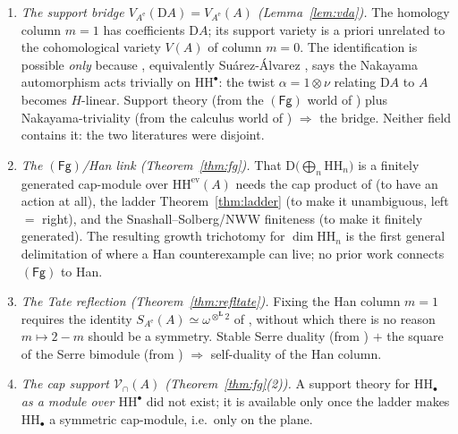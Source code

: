 \documentclass[11pt]{amsart}
\theoremstyle{definition}
\newcommand{\HH}{\mathrm{HH}}
\newcommand{\D}{\mathrm{D}}
\newcommand{\Ae}{A^{\mathrm{e}}}
\newcommand{\Lotimes}{\otimes^{\mathbf{L}}}
\newcommand{\Vcap}{\mathcal{V}_{\cap}}
\newcommand{\Fg}{\mathsf{(Fg)}}
\newcommand{\ev}{\mathrm{ev}}
\begin{document}
\begin{enumerate}[label=\textup{(\alph*)},leftmargin=2.2em]
\item \emph{The support bridge $V_{\Ae}(\D A)=V_{\Ae}(A)$
(Lemma~\ref{lem:vda}).} The homology column $m=1$ has coefficients $\D A$; its
support variety is a priori unrelated to the cohomological variety $V(A)$ of
column $m=0$. The identification is possible \emph{only} because \cite[Cor.~6.3]{ArmCox}, equivalently Su\'arez-\'Alvarez
\cite{SuarezAlvarez}, says the Nakayama automorphism acts trivially on
$\HH^\bullet$: the twist $\alpha=1\otimes\nu$ relating $\D A$ to $A$ becomes
$H$-linear. Support theory (from the $\Fg$ world of \cite{EHSST}) plus
Nakayama-triviality (from the calculus world of \cite{ArmCox}) $\Rightarrow$ the
bridge. Neither field contains it: the two literatures were disjoint.
\item \emph{The $\Fg$/Han link (Theorem~\ref{thm:fg}).} That
$\D\bigl(\bigoplus_n\HH_n\bigr)$ is a finitely generated cap-module over
$\HH^{\ev}(A)$ needs the cap product of \cite{ArmCap} (to have an action at
all), the ladder Theorem~\ref{thm:ladder} (to make it unambiguous, left $=$
right), and the Snashall--Solberg/NWW finiteness \cite{NWW} (to make it
finitely generated). The resulting growth trichotomy for $\dim\HH_n$ is the
first general delimitation of where a Han counterexample can live; no prior
work connects $\Fg$ to Han.
\item \emph{The Tate reflection (Theorem~\ref{thm:refltate}).} Fixing the Han
column $m=1$ requires the identity $S_{\Ae}(A)\simeq\omega^{\Lotimes2}$ of \cite[Thm.~3.2]{ArmTau}, without which there is no reason
$m\mapsto2-m$ should be a symmetry. Stable Serre duality (from \cite{ARS})
$+$ the square of the Serre bimodule (from \cite{ArmTau}) $\Rightarrow$
self-duality of the Han column.
\item \emph{The cap support $\Vcap(A)$ (Theorem~\ref{thm:fg}(2)).} A support
theory for $\HH_\bullet$ \emph{as a module over $\HH^\bullet$} did not exist;
it is available only once the ladder makes $\HH_\bullet$ a symmetric
cap-module, i.e.\ only on the plane.
\end{enumerate}

\end{document}
